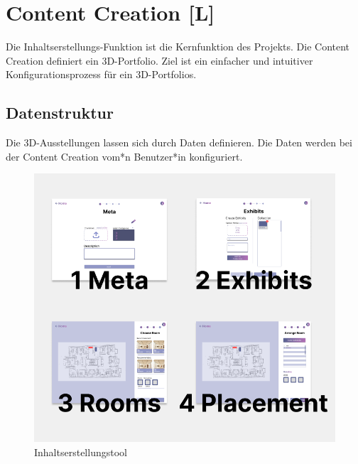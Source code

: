 \section{Content Creation [L]}
Die Inhaltserstellungs-Funktion ist die Kernfunktion des Projekts. Die Content Creation definiert ein 3D-Portfolio. Ziel ist ein einfacher und intuitiver Konfigurationsprozess für ein 3D-Portfolios. 

\subsection{Datenstruktur}
Die 3D-Ausstellungen lassen sich durch Daten definieren. Die Daten werden bei der Content Creation vom*n Benutzer*in konfiguriert. 

\begin{figure}[ht]
    \centering
    \includegraphics[scale=0.4]{pics/CreateCreation4Categories.png}
    \caption{Inhaltserstellungstool}
    \label{fig:impl:creation:fourCategoires}
\end{figure}

